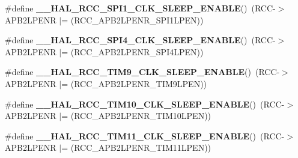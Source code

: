 \begin{DoxyCompactItemize}
\item 
\mbox{\label{group___r_c_c_ex___peripheral___clock___sleep___enable___disable_ga41997855b2cc7563c8ed0c9873d32daf}} 
\#define {\bfseries \+\_\+\+\_\+\+H\+A\+L\+\_\+\+R\+C\+C\+\_\+\+S\+P\+I1\+\_\+\+C\+L\+K\+\_\+\+S\+L\+E\+E\+P\+\_\+\+E\+N\+A\+B\+LE}()~(R\+CC-\/$>$A\+P\+B2\+L\+P\+E\+NR $\vert$= (R\+C\+C\+\_\+\+A\+P\+B2\+L\+P\+E\+N\+R\+\_\+\+S\+P\+I1\+L\+P\+EN))
\item 
\mbox{\label{group___r_c_c_ex___peripheral___clock___sleep___enable___disable_gaf66efe83b28ede4592f8bc8c4e10b8d3}} 
\#define {\bfseries \+\_\+\+\_\+\+H\+A\+L\+\_\+\+R\+C\+C\+\_\+\+S\+P\+I4\+\_\+\+C\+L\+K\+\_\+\+S\+L\+E\+E\+P\+\_\+\+E\+N\+A\+B\+LE}()~(R\+CC-\/$>$A\+P\+B2\+L\+P\+E\+NR $\vert$= (R\+C\+C\+\_\+\+A\+P\+B2\+L\+P\+E\+N\+R\+\_\+\+S\+P\+I4\+L\+P\+EN))
\item 
\mbox{\label{group___r_c_c_ex___peripheral___clock___sleep___enable___disable_ga8fb59f888889fc998d1f7e64e370c9d1}} 
\#define {\bfseries \+\_\+\+\_\+\+H\+A\+L\+\_\+\+R\+C\+C\+\_\+\+T\+I\+M9\+\_\+\+C\+L\+K\+\_\+\+S\+L\+E\+E\+P\+\_\+\+E\+N\+A\+B\+LE}()~(R\+CC-\/$>$A\+P\+B2\+L\+P\+E\+NR $\vert$= (R\+C\+C\+\_\+\+A\+P\+B2\+L\+P\+E\+N\+R\+\_\+\+T\+I\+M9\+L\+P\+EN))
\item 
\mbox{\label{group___r_c_c_ex___peripheral___clock___sleep___enable___disable_gac1215603b81a7d52b7225ec8f628e51d}} 
\#define {\bfseries \+\_\+\+\_\+\+H\+A\+L\+\_\+\+R\+C\+C\+\_\+\+T\+I\+M10\+\_\+\+C\+L\+K\+\_\+\+S\+L\+E\+E\+P\+\_\+\+E\+N\+A\+B\+LE}()~(R\+CC-\/$>$A\+P\+B2\+L\+P\+E\+NR $\vert$= (R\+C\+C\+\_\+\+A\+P\+B2\+L\+P\+E\+N\+R\+\_\+\+T\+I\+M10\+L\+P\+EN))
\item 
\mbox{\label{group___r_c_c_ex___peripheral___clock___sleep___enable___disable_ga2d808a429ceb72c79908770e79ff3cfa}} 
\#define {\bfseries \+\_\+\+\_\+\+H\+A\+L\+\_\+\+R\+C\+C\+\_\+\+T\+I\+M11\+\_\+\+C\+L\+K\+\_\+\+S\+L\+E\+E\+P\+\_\+\+E\+N\+A\+B\+LE}()~(R\+CC-\/$>$A\+P\+B2\+L\+P\+E\+NR $\vert$= (R\+C\+C\+\_\+\+A\+P\+B2\+L\+P\+E\+N\+R\+\_\+\+T\+I\+M11\+L\+P\+EN))

\end{DoxyCompactItemize}

